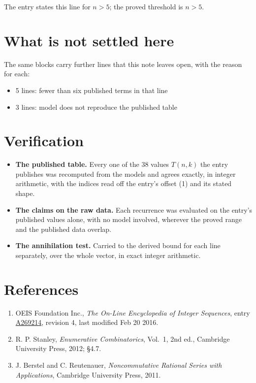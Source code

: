 \documentclass[11pt]{article}
\theoremstyle{definition}
\begin{document}
The entry states this line for $n > 5$; the proved threshold is $n > 5$.

\section{What is not settled here}

The same blocks carry further lines that this note leaves open, with the reason for each:

\begin{itemize}

\item 5 lines: fewer than six published terms in that line

\item 3 lines: model does not reproduce the published table

\end{itemize}

\section{Verification}

\begin{itemize}

\item {\bfseries The published table.} Every one of the 38 values $T(n,k)$ the entry publishes was recomputed from the models and agrees exactly, in integer arithmetic, with the indices read off the entry's offset (1) and its stated shape.

\item {\bfseries The claims on the raw data.} Each recurrence was evaluated on the entry's published values alone, with no model involved, wherever the proved range and the published data overlap.

\item {\bfseries The annihilation test.} Carried to the derived bound for each line separately, over the whole vector, in exact integer arithmetic.

\end{itemize}

\section{References}

\begin{enumerate}

\item OEIS Foundation Inc., \emph{The On-Line Encyclopedia of Integer Sequences}, entry \href{https://oeis.org/A269214}{A269214}, revision 4, last modified Feb 20 2016.

\item R. P. Stanley, \emph{Enumerative Combinatorics}, Vol.~1, 2nd ed., Cambridge University Press, 2012; \S4.7.

\item J. Berstel and C. Reutenauer, \emph{Noncommutative Rational Series with Applications}, Cambridge University Press, 2011.

\end{enumerate}
\end{document}
